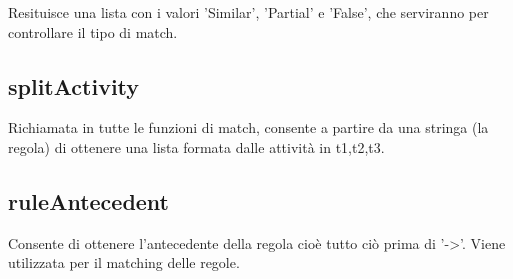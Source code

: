 \documentclass{article}
\begin{document}
Resituisce una lista con i valori 'Similar', 'Partial' e 'False', che serviranno per controllare il tipo di match.

\subsection{splitActivity}
Richiamata in tutte le funzioni di match, consente a partire da una stringa (la regola) di ottenere una lista formata dalle attività in t1,t2,t3.

\subsection{ruleAntecedent}
Consente di ottenere l'antecedente della regola cioè tutto ciò prima di '->'.
Viene utilizzata per il matching delle regole.
\end{document}
